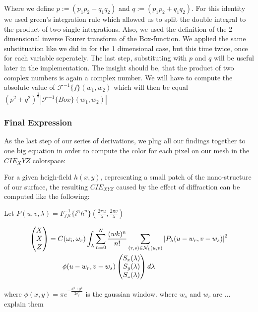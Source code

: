 Where we define $p := (p_1 p_2 - q_1 q_2) $ and $q := (p_1 p_2 + q_1 q_2)$. For this identity we used green's integration rule which allowed us to split the double integral to the product of two single integrations. Also, we used the definition of the 2-dimensional inverse Fourer transform of the Box-function. We applied the same substituation like we did in for the 1 dimensional case, but this time twice, once for each variable seperately. The last step, substituting with $p$ and $q$ will be useful later in the implementation. The insight should be, that the product of two complex numbers is again a complex number. We will have to compute the absolute value of $\mathcal{F}^{-1}\{f\}(w_1,w_2)$ which will then be equal $(p^2 + q^2)^{\frac{1}{2}}\left|\mathcal{F}^{-1}\{Box\}(w_1,w_2)\right|$

\subsubsection{Final Expression}
As the last step of our series of derivations, we plug all our findings together to one big equation in order to compute the color for each pixel on our mesh in the $CIE_XYZ$ colorspace:

For a given heigh-field $h(x,y)$, representing a small patch of the nano-structure of our surface, the resulting $CIE_{XYZ}$ caused by the effect of diffraction can be computed like the following: 

Let $P(u,v,\lambda) = {F}_{fft}^{-1}\{i^n h^n\}(\frac{2\pi u}{\lambda},\frac{2\pi v}{\lambda})$

\begin{equation}
\begin{split}
\colvec[X]{X}{Z}& = C(\omega_i,\omega_r) \int_{\lambda} \sum_{n=0}^N  \frac{(wk)^n}{n!} \sum_{(r,s) \in \mathcal{N}_1(u,v)} \left| P_{\lambda}(u-w_r,v-w_s) \right|^2 \\
& \quad \quad  \phi(u-w_r, v-w_s) \colvec[S_x(\lambda)]{S_y(\lambda)}{S_z(\lambda)}d\lambda
\end{split}
\end{equation}

where $\phi(x,y) = \pi e^{-\frac{x^2 + y^2}{2\sigma_{f}^2}}$ is the gaussian window.
where $w_s$ and $w_r$ are ... explain them


